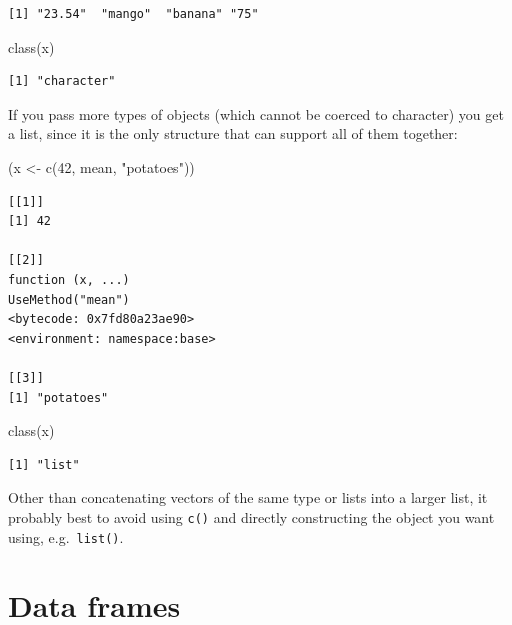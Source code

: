 \documentclass[
]{book}
\newenvironment{Shaded}{\begin{snugshade}}{\end{snugshade}}
\newcommand{\DecValTok}[1]{\textcolor[rgb]{0.00,0.00,0.81}{#1}}
\newcommand{\FunctionTok}[1]{\textcolor[rgb]{0.00,0.00,0.00}{#1}}
\newcommand{\NormalTok}[1]{#1}
\newcommand{\OtherTok}[1]{\textcolor[rgb]{0.56,0.35,0.01}{#1}}
\newcommand{\StringTok}[1]{\textcolor[rgb]{0.31,0.60,0.02}{#1}}
\begin{document}
\begin{verbatim}
[1] "23.54"  "mango"  "banana" "75"    
\end{verbatim}

\begin{Shaded}
\begin{Highlighting}[]
\FunctionTok{class}\NormalTok{(x)}
\end{Highlighting}
\end{Shaded}

\begin{verbatim}
[1] "character"
\end{verbatim}

If you pass more types of objects (which cannot be coerced to character) you get a list, since it is the only structure that can support all of them together:

\begin{Shaded}
\begin{Highlighting}[]
\NormalTok{(x }\OtherTok{\textless{}{-}} \FunctionTok{c}\NormalTok{(}\DecValTok{42}\NormalTok{, mean, }\StringTok{"potatoes"}\NormalTok{))}
\end{Highlighting}
\end{Shaded}

\begin{verbatim}
[[1]]
[1] 42

[[2]]
function (x, ...) 
UseMethod("mean")
<bytecode: 0x7fd80a23ae90>
<environment: namespace:base>

[[3]]
[1] "potatoes"
\end{verbatim}

\begin{Shaded}
\begin{Highlighting}[]
\FunctionTok{class}\NormalTok{(x)}
\end{Highlighting}
\end{Shaded}

\begin{verbatim}
[1] "list"
\end{verbatim}

\begin{rmdnote}
Other than concatenating vectors of the same type or lists into a larger
list, it probably best to avoid using \texttt{c()} and directly
constructing the object you want using, e.g.~\texttt{list()}.
\end{rmdnote}

\hypertarget{data-frames}{%
\section{Data frames}\label{data-frames}}
\end{document}
